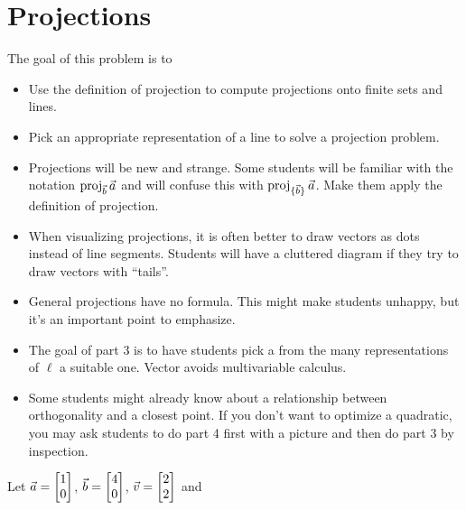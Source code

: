 \documentclass{problemset}
\begin{document}
\section*{Projections}


	\question
	\begin{annotation}
		\begin{goals}

			The goal of this problem is to
			\begin{itemize}
				\item Use the definition of projection to compute projections onto finite sets and lines.
				\item Pick an appropriate representation of a line to solve a projection problem.
			\end{itemize}
		\end{goals}
		\begin{notes}
			\begin{itemize}
				\item Projections will be new and strange. Some students will be familiar with
					the notation $\operatorname{proj}_{\vec b}\vec a$ and will confuse this
					with $\operatorname{proj}_{\{\vec b\}}\vec a$. Make them apply the definition of projection.
				\item When visualizing projections, it is often better to draw vectors as dots instead
					of line segments. Students will have a cluttered diagram if they try to
					draw vectors with ``tails''.
				\item General projections have no formula. This might make students unhappy, but it's an
					important point to emphasize.
				\item The goal of part 3 is to have students pick a from the many representations of $\ell$
					a suitable one. Vector avoids multivariable calculus.

				\item Some students might already know about a relationship between orthogonality and
					a closest point. If you don't want to optimize a quadratic,
					you may ask students to do part 4 first with a picture and then do part 3 by inspection.
			\end{itemize}
		\end{notes}
	\end{annotation}
	Let $\vec a=\mat{1\\0}$, $\vec b=\mat{4\\0}$, $\vec v=\mat{2\\2}$ and
\end{document}
